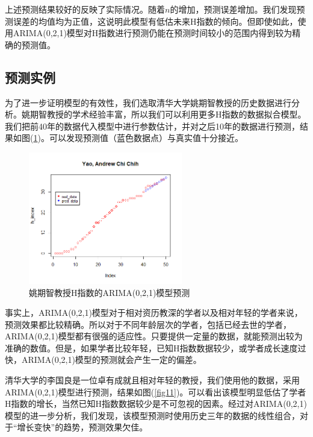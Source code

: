 \documentclass[lang=cn,11pt,a4paper,cite=authoryear]{elegantpaper}
\begin{document}
上述预测结果较好的反映了实际情况。随着$n$的增加，预测误差增加。我们发现预测误差的均值均为正值，这说明此模型有低估未来H指数的倾向。但即使如此，使用ARIMA(0,2,1)模型对H指数进行预测仍能在预测时间较小的范围内得到较为精确的预测值。

\subsection{预测实例}

为了进一步证明模型的有效性，我们选取清华大学姚期智教授的历史数据进行分析。姚期智教授的学术经验丰富，所以我们可以利用更多H指数的数据拟合模型。我们把前40年的数据代入模型中进行参数估计，并对之后10年的数据进行预测，结果如图(\ref{fig10})。可以发现预测值（蓝色数据点）与真实值十分接近。

\begin{figure}[H]
	\centering
	\includegraphics[width=0.6\textwidth]{image/yao_arima.png}
	\caption{姚期智教授H指数的ARIMA(0,2,1)模型预测}
	\label{fig10}
\end{figure}

事实上，ARIMA(0,2,1)模型对于相对资历教深的学者以及相对年轻的学者来说，预测效果都比较精确。所以对于不同年龄层次的学者，包括已经去世的学者，ARIMA(0,2,1)模型都有很强的适应性。只要提供一定量的数据，就能预测出较为准确的数值。但是，如果学者比较年轻，已知H指数数据较少，或学者成长速度过快，ARIMA(0,2,1)模型的预测就会产生一定的偏差。

清华大学的李国良是一位卓有成就且相对年轻的教授，我们使用他的数据，采用ARIMA(0,2,1)模型进行预测，结果如图(\ref{fig11})。可以看出该模型明显低估了学者H指数的增长，当然已知H指数数据较少是不可忽视的因素。经过对ARIMA(0,2,1)模型的进一步分析，我们发现，该模型预测时使用历史三年的数据的线性组合，对于“增长变快”的趋势，预测效果欠佳。
\end{document}
